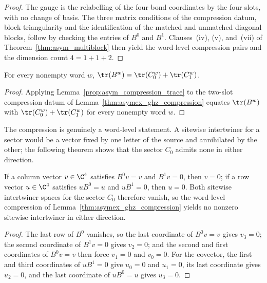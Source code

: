 \begin{proof}
    \leanok
    The gauge is the relabelling of the four bond coordinates by the four
    slots, with no change of basis. The three matrix conditions of the
    compression datum, block triangularity and the identification of the
    matched and unmatched diagonal blocks, follow by checking the entries
    of $B^0$ and $B^1$. Clauses~(iv), (v), and~(vii) of
    Theorem~\ref{thm:asym_multiblock} then yield the word-level
    compression pairs and the dimension count $4=1+1+2$.
\end{proof}

\begin{lemma}
    \label{thm:asymex_ghz_trace}
    \leanok
    For every nonempty word $w$, $\tr(B^w)=\tr(C_0^w)+\tr(C_1^w)$.
\end{lemma}

\begin{proof}
    \leanok
    Applying Lemma~\ref{prop:asym_compression_trace} to the
    two-slot compression datum of Lemma~\ref{thm:asymex_ghz_compression}
    equates $\tr(B^w)$ with $\tr(C_0^w)+\tr(C_1^w)$ for every nonempty
    word $w$.
\end{proof}

The compression is genuinely a word-level statement. A sitewise
intertwiner for a sector would be a vector fixed by one letter of the
source and annihilated by the other; the following theorem shows that
the sector $C_0$ admits none in either direction.

\begin{lemma}
    \label{thm:asymex_ghz_no_intertwiner}
    \leanok
    If a column vector $v\in\C^4$ satisfies $B^0v=v$ and $B^1v=0$,
    then $v=0$; if a row vector $u\in\C^4$ satisfies $uB^0=u$ and
    $uB^1=0$, then $u=0$. Both sitewise intertwiner spaces for the sector
    $C_0$ therefore vanish, so the word-level compression of
    Lemma~\ref{thm:asymex_ghz_compression} yields no nonzero
    sitewise intertwiner in either direction.
\end{lemma}

\begin{proof}
    \leanok
    The last row of $B^0$ vanishes, so the last coordinate of $B^0v=v$
    gives $v_3=0$; the second coordinate of $B^1v=0$ gives $v_2=0$; and the
    second and first coordinates of $B^0v=v$ then force $v_1=0$ and
    $v_0=0$. For the covector, the first and third coordinates of $uB^1=0$
    give $u_0=0$ and $u_1=0$, its last coordinate gives $u_2=0$, and the
    last coordinate of $uB^0=u$ gives $u_3=0$.
\end{proof}

